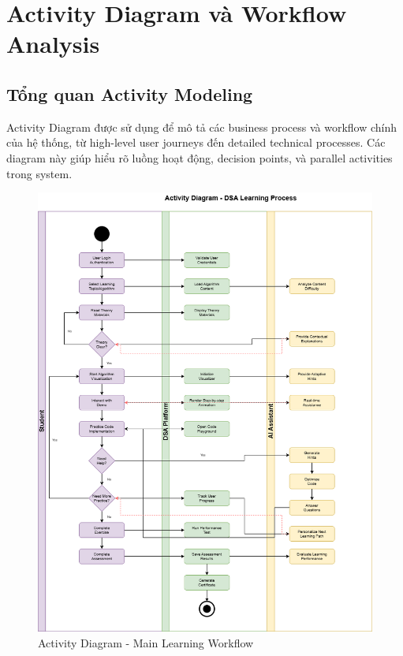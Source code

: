 \section{Activity Diagram và Workflow Analysis}
\label{sec:activity-diagram}

\subsection{Tổng quan Activity Modeling}
\label{subsec:activity-overview}

Activity Diagram được sử dụng để mô tả các business process và workflow chính của hệ thống, từ high-level user journeys đến detailed technical processes. Các diagram này giúp hiểu rõ luồng hoạt động, decision points, và parallel activities trong system.

\begin{figure}[H]
\centering
\includegraphics[width=1.0\textwidth]{enhanced-diagrams/activity-diagram-clean.png}
\caption{Activity Diagram - Main Learning Workflow}
\label{fig:activity-main-workflow}
\end{figure}

